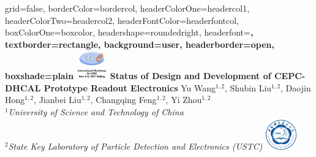 \documentclass[a0paper,portrait]{baposter}
\begin{document}
\begin{poster}{
grid=false,
borderColor=bordercol, %
headerColorOne=headercol1, %
headerColorTwo=headercol2, %
headerFontColor=headerfontcol, %
boxColorOne=boxcolor, %
headershape=roundedright, %
headerfont=\Large\sf\bf, %
textborder=rectangle,
background=user,
headerborder=open, %
boxshade=plain
}
{\includegraphics[width=0.1\textwidth]{figures/CEPCLogoTransparent.png}}
%
%
{ \bf  \huge {Status of Design and Development of CEPC-DHCAL Prototype Readout Electronics} } %
{\vspace{0.3em} \smaller Yu Wang$^{1,2}$, Shubin Liu$^{1,2}$, Daojin Hong$^{1,2}$, Jianbei Liu$^{1,2}$, Changqing Feng$^{1,2}$, Yi Zhou$^{1,2}$ \\  %
  
\smaller $^1$\it {University of Science and Technology of China} \\ $^2$\it{State Key Laboratory of Particle Detection and Electronics (USTC)} } %
{\includegraphics[width=0.1\textwidth]{figures/USTCBlueTransparent.png}} %


\end{poster}
\end{document}
